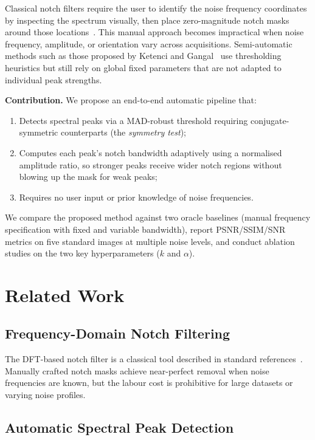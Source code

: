 \documentclass[conference,a4paper]{IEEEtran}
\begin{document}
Classical notch filters require the user to identify the noise frequency coordinates by inspecting the spectrum visually, then place zero-magnitude notch masks around those locations~\cite{pratt2007}. This manual approach becomes impractical when noise frequency, amplitude, or orientation vary across acquisitions. Semi-automatic methods such as those proposed by Ketenci and Gangal~\cite{ketenci2013} use thresholding heuristics but still rely on global fixed parameters that are not adapted to individual peak strengths.

\textbf{Contribution.} We propose an end-to-end automatic pipeline that:
\begin{enumerate}
  \item Detects spectral peaks via a MAD-robust threshold requiring conjugate-symmetric counterparts (the \emph{symmetry test});
  \item Computes each peak's notch bandwidth adaptively using a normalised amplitude ratio, so stronger peaks receive wider notch regions without blowing up the mask for weak peaks;
  \item Requires no user input or prior knowledge of noise frequencies.
\end{enumerate}

We compare the proposed method against two oracle baselines (manual frequency specification with fixed and variable bandwidth), report PSNR/SSIM/SNR metrics on five standard images at multiple noise levels, and conduct ablation studies on the two key hyperparameters ($k$ and $\alpha$).

\section{Related Work}
\label{sec:related}

\subsection{Frequency-Domain Notch Filtering}

The DFT-based notch filter is a classical tool described in standard references~\cite{gonzalez2018,pratt2007}. Manually crafted notch masks achieve near-perfect removal when noise frequencies are known, but the labour cost is prohibitive for large datasets or varying noise profiles.

\subsection{Automatic Spectral Peak Detection}
\end{document}

